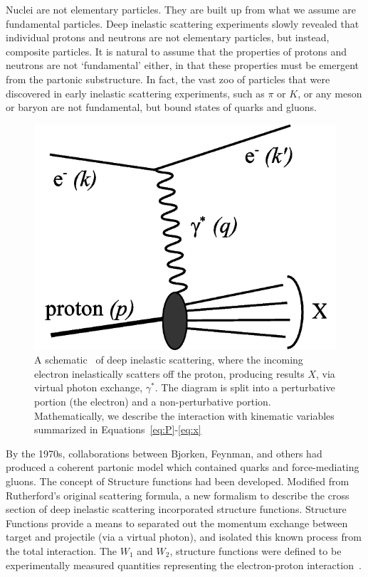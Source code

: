Nuclei are not elementary particles. They are built up from what we assume are
fundamental particles. Deep inelastic scattering experiments slowly revealed
that individual protons and neutrons are not elementary particles, but instead,
composite particles.  It is natural to assume that the properties of protons and
neutrons are not `fundamental' either, in that these properties must be emergent
from the partonic substructure. In fact, the vast zoo of particles that were
discovered in early inelastic scattering experiments, such as $\pi$ or $K$, or
any meson or baryon are not fundamental, but bound states of quarks and gluons.

\begin{figure}[ht]
	\centering
	\includegraphics[width=0.6\linewidth]{./figures/deep_inelastic_basic.png}
	\caption{
    A schematic~\cite{Ddn2_2008} of deep inelastic scattering, where the
    incoming electron inelastically scatters off the proton, producing results
    $X$, via virtual photon exchange, $\gamma^*$. The diagram is split into a
    perturbative portion (the electron) and a non-perturbative portion.
    Mathematically, we describe the interaction with kinematic variables
    summarized in Equations~\ref{eq:P}-\ref{eq:x}
  }
	\label{fig:disschematic}
\end{figure}

By the 1970s, collaborations between Bjorken, Feynman, and others had produced
a coherent partonic model which contained quarks and force-mediating gluons.
The concept of Structure functions had been developed. Modified from
Rutherford's original scattering formula, a new formalism to describe the cross
section of deep inelastic scattering incorporated structure functions. Structure
Functions provide a means to separated out the momentum exchange between target
and projectile (via a virtual photon), and isolated this known process from the
total interaction. The $W_1$ and $W_2$, structure functions were defined to be
experimentally measured quantities representing the electron-proton
interaction~\cite{Riordan1992}.

